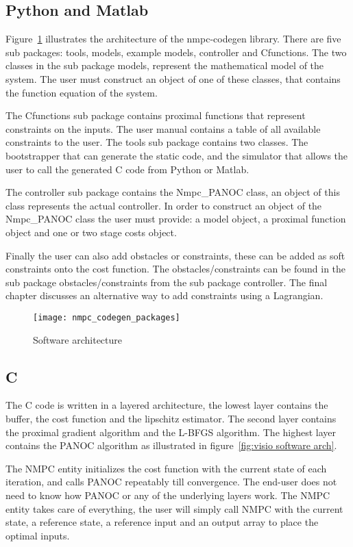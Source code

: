 \subsection{Python and Matlab}
Figure~\ref{fig:nmpc_codegen_packages} illustrates the architecture of the nmpc-codegen library. There are five sub packages: tools, models, example models, controller and Cfunctions.  The two classes in the sub package models, represent the mathematical model of the system. The user must construct an object of one of these classes, that contains the function equation of the system.

The Cfunctions sub package contains proximal functions that represent constraints on the inputs. The user manual contains a table of all available constraints to the user. The tools sub package contains two classes. The bootstrapper that can generate the static code, and the simulator that allows the user to call the generated C code from Python or Matlab.

The controller sub package contains the Nmpc\_PANOC class, an object of this class represents the actual controller. In order to construct an object of the Nmpc\_PANOC class the user must provide: a model object, a proximal function object and one or two stage costs object.

Finally the user can also add obstacles or constraints, these can be added as soft constraints onto the cost function. The obstacles/constraints can be found in the sub package obstacles/constraints from the sub package controller. The final chapter discusses an alternative way to add constraints using a Lagrangian.
	\begin{figure}[H]
		\centering
		\texttt{[image: nmpc\_codegen\_packages]}
		\caption{Software architecture}
		\label{fig:nmpc_codegen_packages}
	\end{figure}

\subsection{C}
The C code is written in a layered architecture, the lowest layer contains the buffer, the cost function and the lipschitz estimator. The second layer contains the proximal gradient algorithm and the L-BFGS algorithm. The highest layer contains the PANOC algorithm as illustrated in figure~\ref{fig:visio software arch}.

The NMPC entity initializes the cost function with the current state of each iteration, and calls PANOC repeatably till convergence. The end-user does not need to know how PANOC or any of the underlying layers work. The NMPC entity takes care of everything, the user will simply call NMPC with the current state, a reference state, a reference input and an output array to place the optimal inputs.

